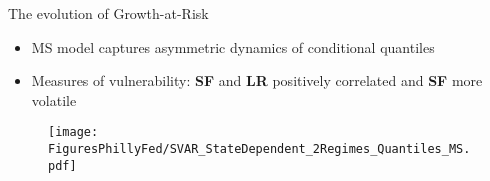 \documentclass[xcolor=dvipsnames, xcolor=table, 10pt]{beamer}
\begin{document}

\begin{frame}{The evolution of Growth-at-Risk}
\begin{itemize}
\item MS model captures asymmetric dynamics of conditional quantiles
\item Measures of vulnerability: \textbf{SF} and \textbf{LR} positively correlated and \textbf{SF} more volatile
\end{itemize}
\centering
\begin{figure}
    \texttt{[image: FiguresPhillyFed/SVAR\_StateDependent\_2Regimes\_Quantiles\_MS.pdf]}
\end{figure}

\end{frame}

\end{document}
